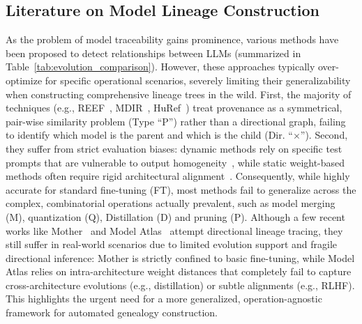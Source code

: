 \subsection{Literature on Model Lineage Construction}


As the problem of model traceability gains prominence, various methods have been proposed to detect relationships between LLMs (summarized in Table~\ref{tab:evolution_comparison}). However, these approaches typically over-optimize for specific operational scenarios, severely limiting their generalizability when constructing comprehensive lineage trees in the wild. First, the majority of techniques (e.g., REEF~\cite{zhang2024reef}, MDIR~\cite{zhang2025matrix}, HuRef~\cite{zeng2024huref}) treat provenance as a symmetrical, pair-wise similarity problem (Type ``P'') rather than a directional graph, failing to identify which model is the parent and which is the child (Dir. ``$\times$''). Second, they suffer from strict evaluation biases: dynamic methods rely on specific test prompts that are vulnerable to output homogeneity~\cite{wu2025tensorguard,wu2025llm,oyama2025mapping,zhang2024reef,yax2024phylolm}, while static weight-based methods often require rigid architectural alignment~\cite{zhang2025matrix,zeng2024huref,yoon2025intrinsic}. Consequently, while highly accurate for standard fine-tuning (FT), most methods fail to generalize across the complex, combinatorial operations actually prevalent, such as model merging (M), quantization (Q), Distillation (D) and pruning (P). Although a few recent works like Mother~\cite{horwitz2024unsupervised} and Model Atlas~\cite{horwitz2025we} attempt directional lineage tracing, they still suffer in real-world scenarios due to limited evolution support and fragile directional inference: Mother is strictly confined to basic fine-tuning, while Model Atlas relies on intra-architecture weight distances that completely fail to capture cross-architecture evolutions (e.g., distillation) or subtle alignments (e.g., RLHF). This highlights the urgent need for a more generalized, operation-agnostic framework for automated genealogy construction.



